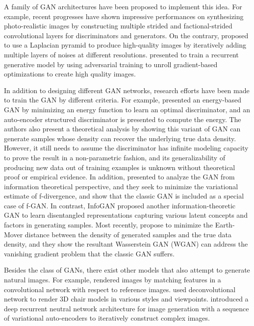 A family of GAN architectures have been proposed to implement this idea.  For example, recent progresses \cite{radford2015unsupervised,salimans2016improved} have shown impressive performances on synthesizing photo-realistic images by constructing multiple strided and factional-strided convolutional layers for discriminators and generators.  On the contrary, \cite{denton2015deep} proposed to use a Laplacian pyramid to produce high-quality images by iteratively adding multiple layers of noises at different resolutions. \cite{im2016generating} presented to train a recurrent generative model by using adversarial training to unroll gradient-based optimizations to create high quality images.

In addition to designing different GAN networks, research efforts have been made to train the GAN by different criteria. For example,
\cite{zhao2016energy} presented an energy-based GAN by minimizing an energy function to learn an optimal discriminator, and an auto-encoder structured discriminator is presented to compute the energy.  The authors also present a theoretical analysis by showing this variant of GAN can generate samples whose density can recover the underlying true data density.  However, it still needs to assume the discriminator has infinite modeling capacity to prove the result in a non-parametric fashion, and its generalizability of producing new data out of training examples is unknown without theoretical proof or empirical evidence.
In addition, \cite{nowozin2016f} presented to analyze the GAN from information theoretical perspective, and they seek to minimize the variational estimate of f-divergence, and show that the classic GAN is included as a special case of f-GAN. In contrast, InfoGAN \cite{chen2016infogan} proposed another information-theoretic GAN to learn disentangled representations capturing various latent concepts and factors in generating samples. Most recently, \cite{wgan17} propose to minimize the Earth-Mover distance between the density of generated samples and the true data density, and they show the resultant Wasserstein GAN (WGAN) can address the vanishing gradient problem that the classic GAN suffers.

Besides the class of GANs, there exist other models that also attempt to generate natural images. For example, \cite{gatys2015neural} rendered images by matching features in a convolutional network with respect to reference images.  \cite{dosovitskiy2015learning} used deconvolutional network to render 3D chair models in various styles and viewpoints.  \cite{gregor2015draw} introduced a deep recurrent neutral network architecture for image generation with a sequence of variational auto-encoders to iteratively construct complex images.


